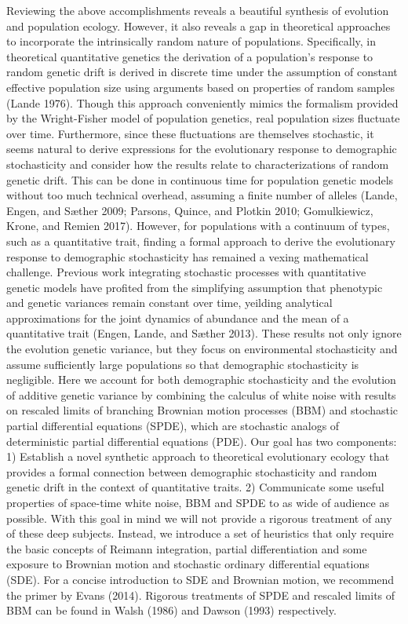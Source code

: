 \documentclass[]{article}
\begin{document}
Reviewing the above accomplishments reveals a beautiful synthesis of
evolution and population ecology. However, it also reveals a gap in
theoretical approaches to incorporate the intrinsically random nature of
populations. Specifically, in theoretical quantitative genetics the
derivation of a population's response to random genetic drift is derived
in discrete time under the assumption of constant effective population
size using arguments based on properties of random samples (Lande 1976).
Though this approach conveniently mimics the formalism provided by the
Wright-Fisher model of population genetics, real population sizes
fluctuate over time. Furthermore, since these fluctuations are
themselves stochastic, it seems natural to derive expressions for the
evolutionary response to demographic stochasticity and consider how the
results relate to characterizations of random genetic drift. This can be
done in continuous time for population genetic models without too much
technical overhead, assuming a finite number of alleles (Lande, Engen,
and Sæther 2009; Parsons, Quince, and Plotkin 2010; Gomulkiewicz, Krone,
and Remien 2017). However, for populations with a continuum of types,
such as a quantitative trait, finding a formal approach to derive the
evolutionary response to demographic stochasticity has remained a vexing
mathematical challenge. Previous work integrating stochastic processes
with quantitative genetic models have profited from the simplifying
assumption that phenotypic and genetic variances remain constant over
time, yeilding analytical approximations for the joint dynamics of
abundance and the mean of a quantitative trait (Engen, Lande, and Sæther
2013). These results not only ignore the evolution genetic variance, but
they focus on environmental stochasticity and assume sufficiently large
populations so that demographic stochasticity is negligible. Here we
account for both demographic stochasticity and the evolution of additive
genetic variance by combining the calculus of white noise with results
on rescaled limits of branching Brownian motion processes (BBM) and
stochastic partial differential equations (SPDE), which are stochastic
analogs of deterministic partial differential equations (PDE). Our goal
has two components: 1) Establish a novel synthetic approach to
theoretical evolutionary ecology that provides a formal connection
between demographic stochasticity and random genetic drift in the
context of quantitative traits. 2) Communicate some useful properties of
space-time white noise, BBM and SPDE to as wide of audience as possible.
With this goal in mind we will not provide a rigorous treatment of any
of these deep subjects. Instead, we introduce a set of heuristics that
only require the basic concepts of Reimann integration, partial
differentiation and some exposure to Brownian motion and stochastic
ordinary differential equations (SDE). For a concise introduction to SDE
and Brownian motion, we recommend the primer by Evans (2014). Rigorous
treatments of SPDE and rescaled limits of BBM can be found in Walsh
(1986) and Dawson (1993) respectively.
\end{document}
